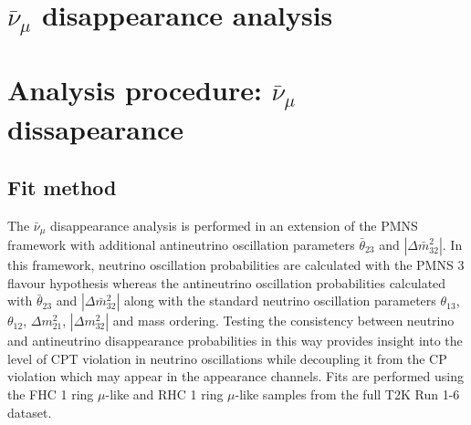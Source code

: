 \clearpage


\section {$\bar{\nu}_{\mu}$ disappearance analysis}
\label{sec:numubardis}


\section {Analysis procedure: $\bar{\nu}_{\mu}$ dissapearance}
\label{sec:oscfit_numubardis}

\subsection {Fit method}
\label{sec:oscfit_method_numubardis}
The $\bar{\nu}_{\mu}$ disappearance analysis is performed in an extension of the PMNS framework with additional antineutrino oscillation parameters $\bar{\theta}_{23}$ and $|\Delta\bar{m}^{2}_{32}|$. In this framework, neutrino oscillation probabilities are calculated with the PMNS 3 flavour hypothesis whereas the antineutrino oscillation probabilities calculated with $\bar{\theta}_{23}$ and $|\Delta\bar{m}^{2}_{32}|$ along with the standard neutrino oscillation parameters $\theta_{13}$,  $\theta_{12}$, $\Delta m^{2}_{21}$, $|\Delta m^{2}_{32}|$ and mass ordering. Testing the consistency between neutrino and antineutrino disappearance probabilities in this way provides insight into the level of CPT violation in neutrino oscillations while decoupling it from the CP violation which may appear in the appearance channels. Fits are performed using the FHC 1 ring $\mu$-like and RHC 1 ring $\mu$-like samples from the full T2K Run 1-6 dataset.


